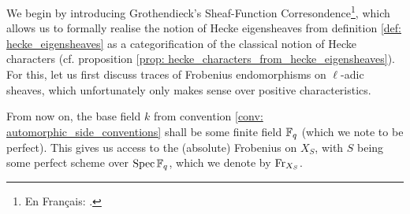         We begin by introducing Grothendieck's Sheaf-Function Corresondence\footnote{En Français: .}, which allows us to formally realise the notion of Hecke eigensheaves from definition \ref{def: hecke_eigensheaves} as a categorification of the classical notion of Hecke characters (cf. proposition \ref{prop: hecke_characters_from_hecke_eigensheaves}). For this, let us first discuss traces of Frobenius endomorphisms on $\ell$-adic sheaves, which unfortunately only makes sense over positive characteristics.
        \begin{convention} \label{conv: frobenii}
            From now on, the base field $k$ from convention \ref{conv: automorphic_side_conventions} shall be some finite field $\mathbb{F}_q$ (which we note to be perfect). This gives us access to the (absolute) Frobenius on $X_S$, with $S$ being some perfect scheme over $\operatorname{Spec} \mathbb{F}_q$, which we denote by $\mathrm{Fr}_{X_S}$.
        \end{convention}
        
